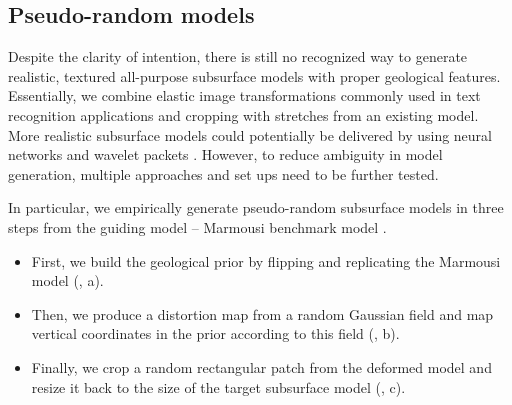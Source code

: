 \documentclass[paper,twocolomn]{geophysics}
\begin{document}
\subsection{Pseudo-random models}
Despite the clarity of intention, there is still no recognized way to generate realistic, textured all-purpose subsurface models with proper geological features.
%
Essentially, we combine elastic image transformations commonly used in text recognition applications \citep{simard2003best} and cropping with stretches \citep{sunLowFrequencyExtrapolation2018} from an existing model. More realistic subsurface models could potentially be delivered by using neural networks \citep{ovcharenko2019style} and wavelet packets \citep{kazei2019realistically}. However, to reduce ambiguity in model generation, multiple approaches and set ups need to be further tested.

%
In particular, we empirically generate pseudo-random subsurface models in three steps from the guiding model -- Marmousi benchmark model \citep{marmousi1991}.

\begin{itemize}
%	
%	

	\item First, we build the geological prior by flipping and replicating the Marmousi model (, a).
	
	\item Then, we produce a distortion map from a random Gaussian field and map vertical coordinates in the prior according to this field (, b).
	
	\item Finally, we crop a random rectangular patch from the deformed model and resize it back to the size of the target subsurface model (, c).
\end{itemize} 
\end{document}
